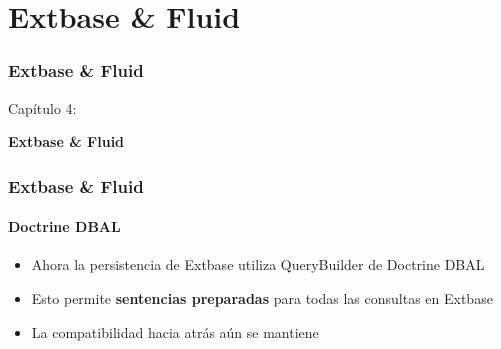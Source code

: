 %

\section{Extbase \& Fluid}
\begin{frame}[fragile]
	\frametitle{Extbase \& Fluid}

	\begin{center}\huge{Capítulo 4:}\end{center}
	\begin{center}\huge{\color{typo3darkgrey}\textbf{Extbase \& Fluid}}\end{center}

\end{frame}


\begin{frame}[fragile]
	\frametitle{Extbase \& Fluid}
	\framesubtitle{Doctrine DBAL}

	\begin{itemize}

		\item Ahora la persistencia de Extbase utiliza QueryBuilder de Doctrine DBAL
		\item Esto permite \textbf{sentencias preparadas} para todas las consultas en Extbase
		\item La compatibilidad hacia atrás aún se mantiene

	\end{itemize}

\end{frame}

